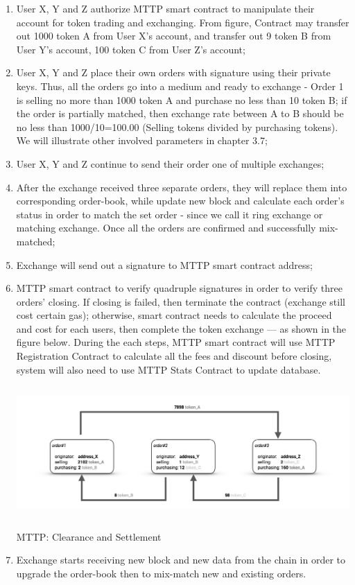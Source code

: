 \documentclass[UTF8,nofonts]{article}
\makeatletter
\newenvironment{figurehere}
 {\def\@captype{figure}}
 {}
\makeatother
\begin{document}
\begin{enumerate}
 \item User X,  Y and Z authorize MTTP smart contract to manipulate their account for token trading and exchanging. From figure,  Contract may transfer out 1000 token A from User X's account,  and transfer out 9 token B from User Y's account,  100 token C from User Z's account;
 \item User X,  Y and Z place their own orders with signature using their private keys. Thus,  all the orders go into a medium and ready to exchange - Order 1 is selling no more than 1000 token A and purchase no less than 10 token B; if the order is partially matched,  then exchange rate between A to B should be no less than 1000/10=100.00 (Selling tokens divided by purchasing tokens). We will illustrate other involved parameters in chapter 3.7;
 \item User X,  Y and Z continue to send their order one of multiple exchanges;
 \item After the exchange received three separate orders,  they will replace them into corresponding order-book, while update new block and calculate each order's status in order to match the set order - since we call it ring exchange or matching exchange. Once all the orders are confirmed and successfully mix-matched;
 \item Exchange will send out a signature to MTTP smart contract address;
 \item MTTP smart contract to verify quadruple signatures in order to verify three orders' closing. If closing is failed,  then terminate the contract (exchange still cost certain gas); otherwise,  smart contract needs to calculate the proceed and cost for each users, then complete the token exchange --- as shown in the figure below. During the each steps, MTTP smart contract will use MTTP Registration Contract to calculate all the fees and discount before closing,  system will also need to use MTTP Stats Contract to update database.
 
 \begin{center}
\begin{figurehere}
\includegraphics[height=5cm]{images/en-mttp-example.png}
\caption{MTTP: Clearance and Settlement}
\label{fig:MTTPprotocol}
\end{figurehere}
\end{center}

 \item Exchange starts receiving new block and new data from the chain in order to upgrade the order-book then to mix-match new and existing orders.
\end{enumerate}
\end{document}
